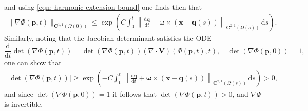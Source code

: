 \documentclass[a4paper]{amsart}
\numberwithin{equation}{section}
\newcommand{\grad}{\nabla}
\newcommand{\Div}{\nabla \cdot}
\theoremstyle{plain}
\newcommand{\mbf}[1]{\mathbf{#1}}
\begin{document}
and using \eqref{eqn: harmonic extension bound} one finds then that
\begin{align}
	\|\grad \Phi(\mbf{p},t)\|_{\mbf{C}^{1,1}(\Omega(0))} \leq \exp \left( C \int_0^t \left\| \frac{\mathrm{d}\mbf{q}}{\mathrm{d}t} + \boldsymbol{\omega} \times (\mbf{x} - \mbf{q}(s)) \right\|_{\mbf{C}^{2,1}(\Omega(s))} \, \mathrm{d}s \right). \label{grad bound}
\end{align}
Similarly, noting that the Jacobian determinant satisfies the ODE
\[\frac{\mathrm{d}}{\mathrm{d}t} \det(\grad \Phi(\mbf{p}, t)) = \det(\grad \Phi(\mbf{p}, t)) (\Div \mbf{V})(\Phi(\mbf{p}, t),t), \quad \det(\grad \Phi(\mbf{p},0)) = 1,\]
one can show that
\begin{align}
	|\det(\grad \Phi(\mbf{p}, t))| \geq \exp \left(-C \int_0^t \left\| \frac{\mathrm{d}\mbf{q}}{\mathrm{d}t} + \boldsymbol{\omega} \times (\mbf{x} - \mbf{q}(s)) \right\|_{\mbf{C}^{2,1}(\Omega(s))} \, \mathrm{d}s \right) >0, \label{grad bound2}
\end{align}
and since $\det(\grad \Phi(\mbf{p},0)) = 1$ it follows that $\det(\grad \Phi(\mbf{p}, t)) > 0$, and $\grad \Phi$ is invertible.
\end{document}
